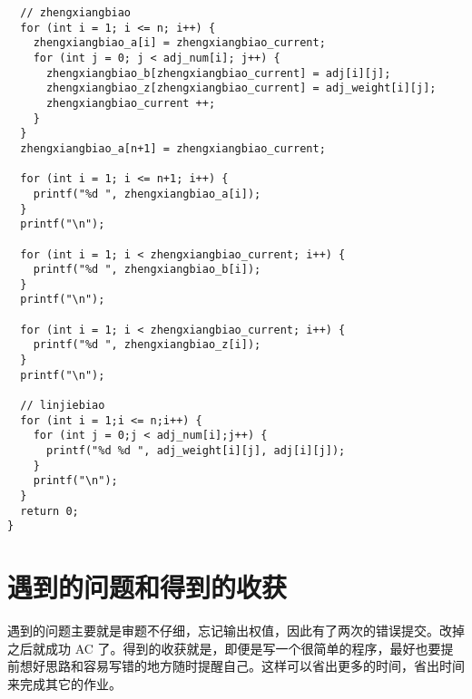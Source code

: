 \documentclass[11pt]{article}
\begin{document}
\begin{verbatim}
  // zhengxiangbiao
  for (int i = 1; i <= n; i++) {
    zhengxiangbiao_a[i] = zhengxiangbiao_current;
    for (int j = 0; j < adj_num[i]; j++) {
      zhengxiangbiao_b[zhengxiangbiao_current] = adj[i][j];
      zhengxiangbiao_z[zhengxiangbiao_current] = adj_weight[i][j];
      zhengxiangbiao_current ++;
    }
  }
  zhengxiangbiao_a[n+1] = zhengxiangbiao_current;

  for (int i = 1; i <= n+1; i++) {
    printf("%d ", zhengxiangbiao_a[i]);
  }
  printf("\n");

  for (int i = 1; i < zhengxiangbiao_current; i++) {
    printf("%d ", zhengxiangbiao_b[i]);
  }
  printf("\n");

  for (int i = 1; i < zhengxiangbiao_current; i++) {
    printf("%d ", zhengxiangbiao_z[i]);
  }
  printf("\n");

  // linjiebiao
  for (int i = 1;i <= n;i++) {
    for (int j = 0;j < adj_num[i];j++) {
      printf("%d %d ", adj_weight[i][j], adj[i][j]);
    }
    printf("\n");
  }
  return 0;
}

\end{verbatim}

\section{遇到的问题和得到的收获}
\label{sec:org5886261}
遇到的问题主要就是审题不仔细，忘记输出权值，因此有了两次的错误提交。改掉之后就成功 AC 了。得到的收获就是，即便是写一个很简单的程序，最好也要提前想好思路和容易写错的地方随时提醒自己。这样可以省出更多的时间，省出时间来完成其它的作业。
\end{document}
